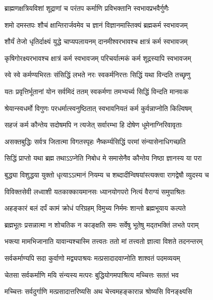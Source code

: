 \twolineshloka
{ब्राह्मणक्षत्रियविशां शूद्राणां च परंतप}
{कर्माणि प्रविभक्तानि स्वभावप्रभवैर्गुणैः}


\twolineshloka
{शमो दमस्तपः शौचं क्षान्तिरार्जवमेव च}
{ज्ञानं विज्ञानमास्तिक्यं ब्रह्मकर्म स्वभावजम्}


\twolineshloka
{शौर्यं तेजो धृतिर्दाक्ष्यं युद्धे चाप्यपलायनम्}
{दानमीश्वरभावश्च क्षात्रं कर्म स्वभावजम्}


\twolineshloka
{कृषिगोरक्ष्यरभावश्च क्षात्रं कर्म स्वभावजम्}
{परिचर्यात्मकं कर्म शूद्रस्यापि स्वभावजम्}


\twolineshloka
{स्वे स्वे कर्मण्यभिरतः संसिद्धिं लभते नरः}
{स्वकर्मनिरत्तः सिद्धिं यथा विन्दति तच्छृणु}


\twolineshloka
{यतः प्रवृत्तिर्भूतानां योन सर्वमिदं ततम्}
{स्वकर्मणा तमभ्यर्च्य सिद्धिं विन्दति मानवःक}


\twolineshloka
{श्रेयान्स्वधर्मो विगुणः परधर्मात्स्वनुष्ठितात्}
{स्वभावनियतं कर्म कुर्वन्नाप्नोति किल्विषम्}


\twolineshloka
{सहजं कर्म कौन्तेय सदोषमपि न त्यजेत्}
{सर्वारम्भा हि दोषेण धूमेनाग्निरिवावृताः}


\twolineshloka
{असक्तबुद्धिः सर्वत्र जितात्मा विगतस्पृहः}
{नैष्कर्म्यसिद्धिं परमां संन्यासेनाधिगच्छति}


\twolineshloka
{सिद्धिं प्राप्तो यथा ब्रह्म तथाऽऽप्नेति निबोध मे}
{समासेनैव कौन्तेय निष्ठा ज्ञानस्य या परा}


\twolineshloka
{बुद्ध्या विशुद्धया युक्तो धृत्याऽऽत्मानं नियम्य च}
{शब्दादीन्विषयांस्त्यक्त्वा रागद्वेषौ व्युदस्य च}


\twolineshloka
{विविक्तसेवी लध्वाशी यतकाक्कायमानसः}
{ध्यानयोगपरो नित्यं वैराग्यं समुपाश्रितः}


\twolineshloka
{अहङ्कारं बलं दर्पं कामं क्रोधं परिग्रहम्}
{विमुच्य निर्ममः शान्तो ब्रह्मभूयाय कल्पते}


\twolineshloka
{ब्रह्मभूतः प्रसन्नात्मा न शोचतिक न काङ्क्षति}
{समः सर्वेषु भूतेषु मद्तभक्तिं लभते पराम्}


\twolineshloka
{भक्त्या मामभिजानाति यावान्यश्चास्मि तत्त्वतः}
{ततो मां तत्त्वतो ज्ञात्वा विशते तदनन्तरम्}


\twolineshloka
{सर्वकर्माण्यपि सदा कुर्वाणो मद्व्यपाश्रयः}
{मत्प्रसादादवाप्नोति शाश्वतं पदमव्ययम्}


\twolineshloka
{चेतसा सर्वकर्माणि मयि संन्यस्य मत्परः}
{बुद्धियोगमपाश्रित्य मच्चित्तः सततं भव}


\twolineshloka
{मच्चित्तः सर्वदुर्गाणि मत्प्रसादात्तरिष्यसि}
{अथ चेत्त्वमहङ्कारान्न श्रोष्यसि विनङ्क्ष्यसि}


